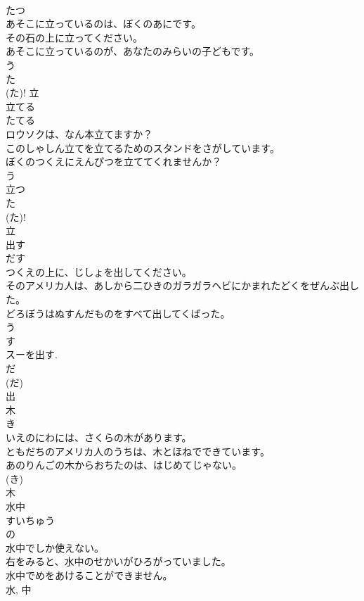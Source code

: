 \documentclass[8pt]{extreport}
\begin{document}
\begin{CJK}{UTF8}{min}
\\	たつ	
\\	あそこに立っているのは、ぼくのあにです。	
\\	その石の上に立ってください。	
\\	あそこに立っているのが、あなたのみらいの子どもです。	
\\	う 
\\	た 
\\	(た)!	立	
\\	立てる	
\\	たてる	
\\	ロウソクは、なん本立てますか？	
\\	このしゃしん立てを立てるためのスタンドをさがしています。	
\\	ぼくのつくえにえんぴつを立ててくれませんか？	
\\	う 
\\	立つ 
\\	た 
\\	(た)!
\\	立	
\\	出す	
\\	だす	
\\	つくえの上に、じしょを出してください。	
\\	そのアメリカ人は、あしから二ひきのガラガラヘビにかまれたどくをぜんぶ出した。	
\\	どろぼうはぬすんだものをすべて出してくばった。	
\\	う 
\\	す 
\\	スーを出す.
\\	だ 
\\	(だ) 
\\	出	
\\	木	
\\	き	
\\	いえのにわには、さくらの木があります。	
\\	ともだちのアメリカ人のうちは、木とほねでできています。	
\\	あのりんごの木からおちたのは、はじめてじゃない。	
\\	(き) 
\\	木	
\\	水中	
\\	すいちゅう	
\\	の 
\\	水中でしか使えない。	
\\	右をみると、水中のせかいがひろがっていました。	
\\	水中でめをあけることができません。	
\\	水, 中	

\end{CJK}
\end{document}

